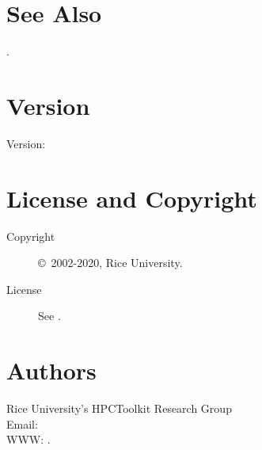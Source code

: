 \documentclass[english]{article}
\begin{document}



\section{See Also}

.

\section{Version}

Version: \Version

\section{License and Copyright}

\begin{description}
\item[Copyright] \copyright\ 2002-2020, Rice University.
\item[License] See .
\end{description}

\section{Authors}

\noindent
Rice University's HPCToolkit Research Group \\
Email:  \\
WWW: .

\LatexManEnd
\end{document}
